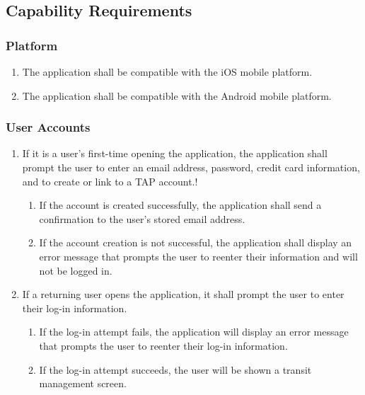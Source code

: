 \subsection{Capability Requirements}

	\subsubsection{Platform}\begin{enumerate}
		\item The application shall be compatible with the iOS mobile platform.
		\item The application shall be compatible with the Android mobile platform.
	\end{enumerate}
	
	\subsubsection{User Accounts}\begin{enumerate}
		\item If it is a user’s first-time opening the application, the application shall prompt the user to enter an email address, password, credit card information, and to create or link to a TAP account.!
		\begin{enumerate}
			\item If the account is created successfully, the application shall send a confirmation to the user’s stored email address.
			\item If the account creation is not successful, the application shall display an error message that prompts the user to reenter their information and will not be logged in.
		\end{enumerate}
		\item If a returning user opens the application, it shall prompt the user to enter their log-in information.
			\begin{enumerate}
				\item If the log-in attempt fails, the application will display an error message that prompts the user to reenter their log-in information.
				\item If the log-in attempt succeeds, the user will be shown a transit management screen.
			\end{enumerate}
	\end{enumerate}
	
